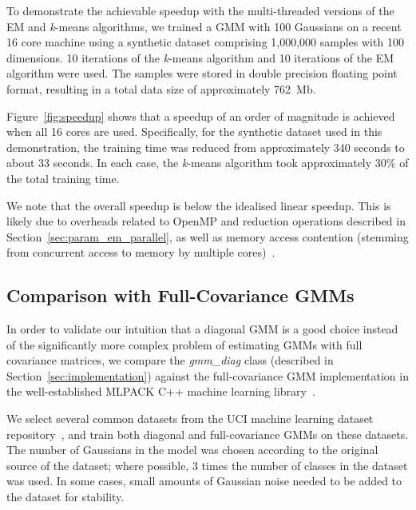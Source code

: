 To demonstrate the achievable speedup with the multi-threaded versions of the EM and {\it k}-means algorithms,
we trained a GMM with 100 Gaussians on a recent 16 core machine using a synthetic dataset comprising 1,000,000 samples with 100 dimensions.
10 iterations of the {\it k}-means algorithm and 10 iterations of the EM algorithm were used.
The samples were stored in double precision floating point format, resulting in a total data size of approximately 762~Mb.

Figure~\ref{fig:speedup} shows that a speedup of an order of magnitude is achieved when all 16 cores are used.
Specifically, for the synthetic dataset used in this demonstration,
the training time was reduced from approximately 340 seconds to about 33 seconds.
In each case, the {\it k}-means algorithm took approximately 30\% of the total training time.

We note that the overall speedup is below the idealised linear speedup.
This is likely due to overheads related to OpenMP and reduction operations described in Section~\ref{sec:param_em_parallel},
as well as memory access contention (stemming from concurrent access to memory by multiple cores)~\cite{McCool_2012}.

\subsection{Comparison with Full-Covariance GMMs}


In order to validate our intuition that a diagonal GMM is a good choice instead
of the significantly more complex problem of estimating GMMs with full
covariance matrices, we compare the {\it gmm\_diag} class (described in Section~\ref{sec:implementation})
against the full-covariance GMM implementation in the well-established MLPACK C++ machine learning library~\cite{Curtin_2013}.

We select several common datasets from the UCI machine learning dataset
repository~\cite{Lichman_2013}, and train both diagonal and full-covariance
GMMs on these datasets.  The number of Gaussians in the model was chosen
according to the original source of the dataset; where possible, 3 times the
number of classes in the dataset was used.  In some cases, small amounts of
Gaussian noise needed to be added to the dataset for stability.

